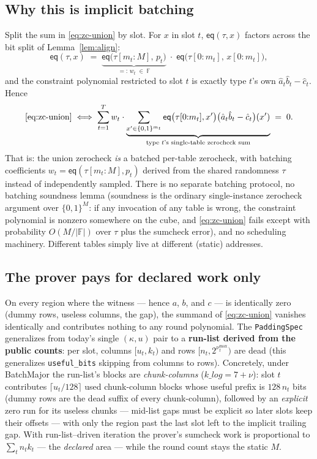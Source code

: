 \documentclass[11pt]{article}
\newcommand{\F}{\mathbb{F}}                       %
\newcommand{\eq}{\mathsf{eq}}
\newcommand{\code}[1]{\texttt{#1}}
\theoremstyle{definition}
\begin{document}
\subsection{Why this is implicit batching}

Split the sum in \eqref{eq:zc-union} by slot. For $x$ in slot $t$,
$\eq(\tau, x)$ factors across the bit split of Lemma~\ref{lem:align}:
\[
  \eq(\tau, x) \;=\;
  \underbrace{\eq\bigl(\tau[m_t{:}M],\, p_t\bigr)}_{=: \, w_t \;\in\; \F}
  \;\cdot\;
  \eq\bigl(\tau[0{:}m_t],\, x[0{:}m_t]\bigr),
\]
and the constraint polynomial restricted to slot $t$ is exactly type
$t$'s own $\hat a_t \hat b_t - \hat c_t$. Hence
\begin{equation}\label{eq:implicit-batch}
  \eqref{eq:zc-union}
  \iff
  \sum_{t=1}^{T} w_t \cdot
  \underbrace{\sum_{x' \in \{0,1\}^{m_t}}
     \eq\bigl(\tau[0{:}m_t], x'\bigr)
     \bigl(\hat a_t \hat b_t - \hat c_t\bigr)(x')}_{\text{type } t\text{'s
     single-table zerocheck sum}} \;=\; 0 .
\end{equation}
That is: the union zerocheck \emph{is} a batched per-table zerocheck, with
batching coefficients $w_t = \eq(\tau[m_t{:}M], p_t)$ derived from the shared
randomness $\tau$ instead of independently sampled. There is no separate
batching protocol, no batching soundness lemma (soundness is the ordinary
single-instance zerocheck argument over $\{0,1\}^M$: if any invocation of any
table is wrong, the constraint polynomial is nonzero somewhere on the cube,
and \eqref{eq:zc-union} fails except with probability
$O(M/|\F|)$ over $\tau$ plus the sumcheck error), and no scheduling
machinery. Different tables simply live at different (static) addresses.

\subsection{The prover pays for declared work only}\label{sec:zc-sparse}

On every region where the witness --- hence $a$, $b$, and $c$ --- is
identically zero (dummy rows, useless columns, the gap), the summand of
\eqref{eq:zc-union} vanishes identically and contributes nothing to any
round polynomial. The \code{PaddingSpec} generalizes from today's single
$(\kappa, u)$ pair to a \textbf{run-list derived from the public counts}:
per slot, columns $[u_t, k_t)$ and rows $[n_t, 2^{\nu_t^{\max}})$ are dead
(this generalizes \code{useful\_bits} skipping from columns to rows).
Concretely, under BatchMajor the run-list's blocks are
\emph{chunk-columns} ($k\_log = 7 + \nu$): slot $t$ contributes
$\lceil u_t/128 \rceil$ used chunk-column blocks whose useful prefix is
$128\, n_t$ bits (dummy rows are the dead suffix of every chunk-column),
followed by an \emph{explicit} zero run for its useless chunks ---
mid-list gaps must be explicit so later slots keep their offsets --- with
only the region past the last slot left to the implicit trailing gap.
With run-list--driven iteration the prover's sumcheck work is
proportional to
$\sum_t n_t k_t$ --- the \emph{declared} area --- while the round count
stays the static $M$.
\end{document}
